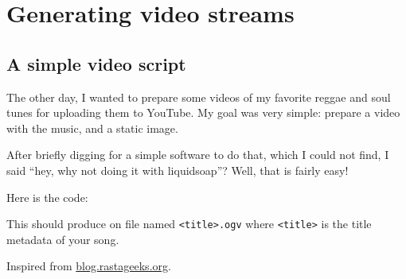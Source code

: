 \chapter{Generating video streams}
\section{A simple video script}
The other day, I wanted to prepare some videos of my favorite reggae and soul
tunes for uploading them to YouTube.  My goal was very simple: prepare a video
with the music, and a static image.

After briefly digging for a simple software to do that, which I could not find,
I said ``hey, why not doing it with liquidsoap''?  Well, that is fairly easy!

Here is the code:







This should produce on file named \verb+<title>.ogv+ where \verb+<title>+ is the
title metadata of your song.

Inspired from
\href{http://blog.rastageeks.org/spip.php?article27}{blog.rastageeks.org}.
